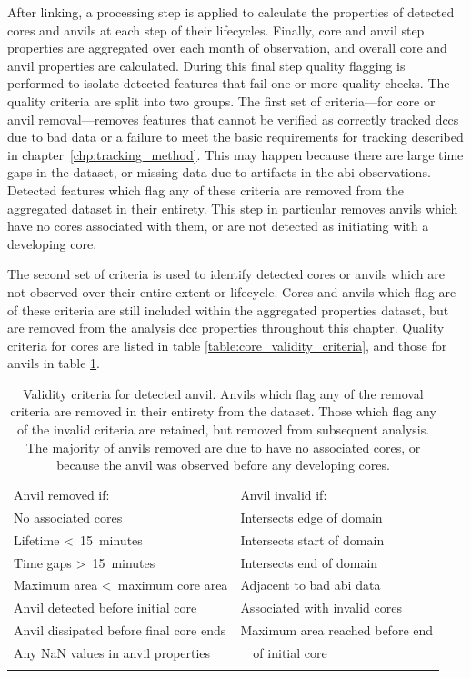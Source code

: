After linking, a processing step is applied to calculate the properties of detected cores and anvils at each step of their lifecycles.
Finally, core and anvil step properties are aggregated over each month of observation, and overall core and anvil properties are calculated.
During this final step quality flagging is performed to isolate detected features that fail one or more quality checks.
The quality criteria are split into two groups.
The first set of criteria---for core or anvil removal---removes features that cannot be verified as correctly tracked \acrshort{dcc}s due to bad data or a failure to meet the basic requirements for tracking described in chapter~\ref{chp:tracking_method}.
This may happen because there are large time gaps in the dataset, or missing data due to artifacts in the \acrshort{abi} observations.
Detected features which flag any of these criteria are removed from the aggregated dataset in their entirety.
This step in particular removes anvils which have no cores associated with them, or are not detected as initiating with a developing core.

The second set of criteria is used to identify detected cores or anvils which are not observed over their entire extent or lifecycle.
Cores and anvils which flag are of these criteria are still included within the aggregated properties dataset, but are removed from the analysis \acrshort{dcc} properties throughout this chapter.
Quality criteria for cores are listed in table \ref{table:core_validity_criteria}, and those for anvils in table \ref{table:anvil_validity_criteria}.


\begin{table}[tb]
\centering
\begin{tabular}{ll}
\tophline
Anvil removed if:                               & Anvil invalid if: \\
\middlehline
No associated cores                             & Intersects edge of domain \\
Lifetime \textless~15~minutes                   & Intersects start of domain \\             
Time gaps \textgreater~15~minutes               & Intersects end of domain \\
Maximum area \textless~maximum core area        & Adjacent to bad \acrshort{abi} data \\
Anvil detected before initial core              & Associated with invalid cores \\
Anvil dissipated before final core ends         & Maximum area reached before end \\
Any NaN values in anvil properties              & ~~of initial core \\
\bottomhline
\end{tabular}
\caption[
Validity criteria for detected anvils
]{
Validity criteria for detected anvil. Anvils which flag any of the removal criteria are removed in their entirety from the dataset. Those which flag any of the invalid criteria are retained, but removed from subsequent analysis. The majority of anvils removed are due to have no associated cores, or because the anvil was observed before any developing cores.}
\label{table:anvil_validity_criteria}
\end{table}


